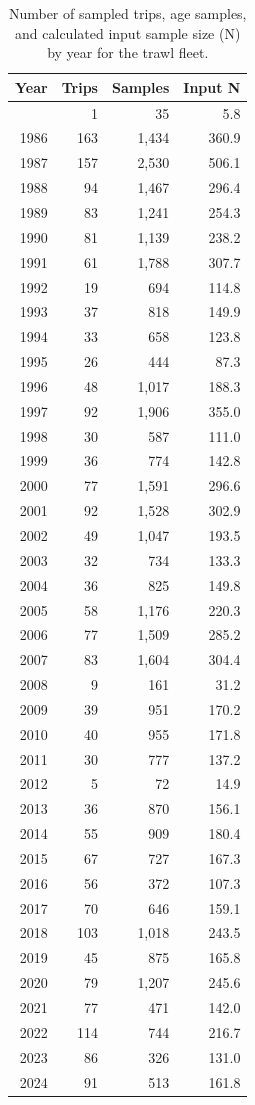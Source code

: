 \documentclass[
  english,
]{article}
\begin{document}
\begin{longtable}{rrrr}

\caption{\label{tbl-twl-age-samples}Number of sampled trips, age
samples, and calculated input sample size (N) by year for the trawl
fleet.}

\tabularnewline

\toprule
Year & Trips & Samples & Input N \\ 
\midrule\addlinespace[2.5pt]
1983 & 1 & 35 & 5.8 \\ 
1986 & 163 & 1,434 & 360.9 \\ 
1987 & 157 & 2,530 & 506.1 \\ 
1988 & 94 & 1,467 & 296.4 \\ 
1989 & 83 & 1,241 & 254.3 \\ 
1990 & 81 & 1,139 & 238.2 \\ 
1991 & 61 & 1,788 & 307.7 \\ 
1992 & 19 & 694 & 114.8 \\ 
1993 & 37 & 818 & 149.9 \\ 
1994 & 33 & 658 & 123.8 \\ 
1995 & 26 & 444 & 87.3 \\ 
1996 & 48 & 1,017 & 188.3 \\ 
1997 & 92 & 1,906 & 355.0 \\ 
1998 & 30 & 587 & 111.0 \\ 
1999 & 36 & 774 & 142.8 \\ 
2000 & 77 & 1,591 & 296.6 \\ 
2001 & 92 & 1,528 & 302.9 \\ 
2002 & 49 & 1,047 & 193.5 \\ 
2003 & 32 & 734 & 133.3 \\ 
2004 & 36 & 825 & 149.8 \\ 
2005 & 58 & 1,176 & 220.3 \\ 
2006 & 77 & 1,509 & 285.2 \\ 
2007 & 83 & 1,604 & 304.4 \\ 
2008 & 9 & 161 & 31.2 \\ 
2009 & 39 & 951 & 170.2 \\ 
2010 & 40 & 955 & 171.8 \\ 
2011 & 30 & 777 & 137.2 \\ 
2012 & 5 & 72 & 14.9 \\ 
2013 & 36 & 870 & 156.1 \\ 
2014 & 55 & 909 & 180.4 \\ 
2015 & 67 & 727 & 167.3 \\ 
2016 & 56 & 372 & 107.3 \\ 
2017 & 70 & 646 & 159.1 \\ 
2018 & 103 & 1,018 & 243.5 \\ 
2019 & 45 & 875 & 165.8 \\ 
2020 & 79 & 1,207 & 245.6 \\ 
2021 & 77 & 471 & 142.0 \\ 
2022 & 114 & 744 & 216.7 \\ 
2023 & 86 & 326 & 131.0 \\ 
2024 & 91 & 513 & 161.8 \\ 
\bottomrule

\end{longtable}
\end{document}
